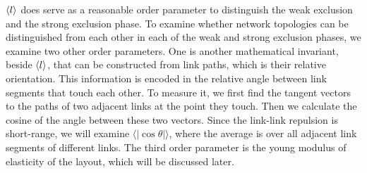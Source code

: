 \documentclass[nofootinbib,preprint,floatfix,endfloats]{revtex4} %
\begin{document}
$\left<l\right>$ does serve as a reasonable order parameter to distinguish the weak exclusion and the strong exclusion phase. 
To examine whether network topologies can be distinguished from each other in each of the weak and strong exclusion phases, we examine two other order parameters. 
One is another mathematical invariant, beside $\left<l\right>$,  that can be constructed from link paths, %
which is their relative orientation. 
This information is encoded in the relative angle between link segments that touch each other. To measure it, we  first find the tangent vectors to the paths of two adjacent links at the point they touch.  Then we calculate the cosine of the angle between these two  vectors. 
Since the link-link repulsion is short-range, 
we will examine $\langle |\cos\theta |\rangle$, where the average is over all adjacent link segments of different links. The third order parameter is the young modulus of elasticity of the layout, which will be discussed later. 
\end{document}
